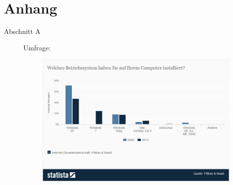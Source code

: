 

\chapter*{Anhang}


%
\begin{description}
\item[Abschnitt A]
Umfrage:
\begin{figure}[H]
\centering
\includegraphics[width=1\linewidth]{../images/Betriebssysteme.jpg}
\end{figure}



\end{description}





